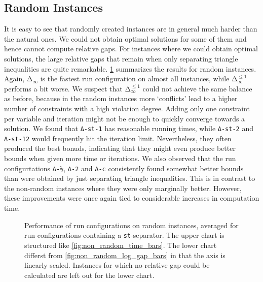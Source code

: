 \subsection{Random Instances}
It is easy to see that randomly created instances are in general much harder than the natural ones.
We could not obtain optimal solutions for some of them and hence cannot compute relative gaps.
For instances where we could obtain optimal solutions, the large relative gaps that remain when only separating triangle inequalities are quite remarkable.
\cref{fig:random_time_and_gap_bars} summarizes the results for random instances.
Again, $\texttt{Δ}_{\infty}$ is the fastest run configuration on almost all instances, while $\texttt{Δ}_{\infty}^{\leq 1}$ performs a bit worse.
We suspect that $\texttt{Δ}_{\infty}^{\leq 1}$ could not achieve the same balance as before, because in the random instances more ‘conflicts’ lead to a higher number of constraints with a high violation degree.
Adding only one constraint per variable and iteration might not be enough to quickly converge towards a solution.
We found that \texttt{Δ-st-1} has reasonable running times, while \texttt{Δ-st-2} and \texttt{Δ-st-12} would frequently hit the iteration limit.
Nevertheless, they often produced the best bonuds, indicating that they might even produce better bounds when given more time or iterations.
We also observed that the run configurtations \texttt{Δ-½}, \texttt{Δ-2} and \texttt{Δ-c} consistently found somewhat better bounds than were obtained by just separating triangle inequalities.
This is in contrast to the non-random instances where they were only marginally better.
However, these improvements were once again tied to considerable increases in computation time.

\begin{figure}[H]
	\centering
	\resizebox{0.95\linewidth}{!}{
	}
	\bigskip
	\caption[Performance on random data]{Performance of run configurations on random instances, averaged for run configurations containing a \texttt{st}-separator.
		The upper chart is structured like \cref{fig:non_random_time_bars}.
		The lower chart differst from \cref{fig:non_random_log_gap_bars} in that the axis is linearly scaled.
		Instances for which no relative gap could be calculated are left out for the lower chart.
	}
	\label{fig:random_time_and_gap_bars}
\end{figure}
